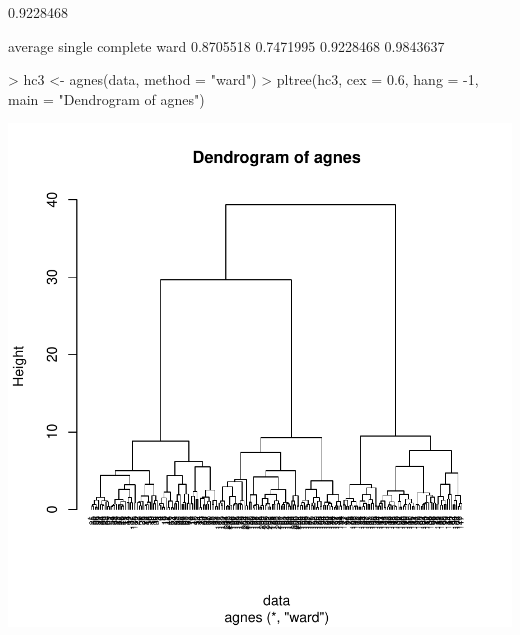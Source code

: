 \documentclass [a4paper] {article}
\begin{document}
\begin{Schunk}
\begin{Soutput}
[1] 0.9228468
\end{Soutput}
\begin{Soutput}
  average    single  complete      ward 
0.8705518 0.7471995 0.9228468 0.9843637 
\end{Soutput}
\begin{Sinput}
> hc3 <- agnes(data, method = "ward")
> pltree(hc3, cex = 0.6, hang = -1, main = "Dendrogram of agnes")
\end{Sinput}
\end{Schunk}
\includegraphics{entrega-jerarquico_2}
\end{document}
